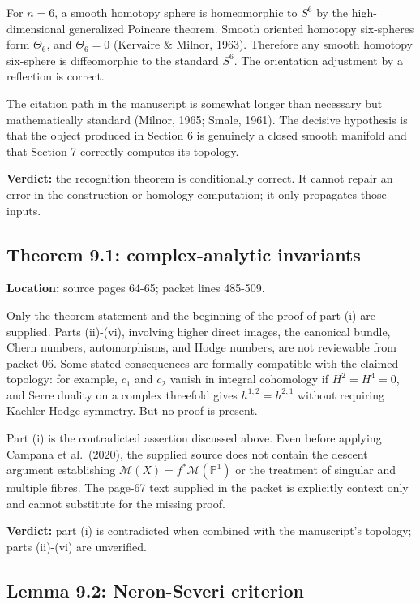 \documentclass[
  10pt,
]{article}
\begin{document}
For \(n=6\), a smooth homotopy sphere is homeomorphic to \(S^6\) by the
high-dimensional generalized Poincare theorem. Smooth oriented homotopy
six-spheres form \(\Theta_6\), and \(\Theta_6=0\) (Kervaire \& Milnor,
1963). Therefore any smooth homotopy six-sphere is diffeomorphic to the
standard \(S^6\). The orientation adjustment by a reflection is correct.

The citation path in the manuscript is somewhat longer than necessary
but mathematically standard (Milnor, 1965; Smale, 1961). The decisive
hypothesis is that the object produced in Section 6 is genuinely a
closed smooth manifold and that Section 7 correctly computes its
topology.

\textbf{Verdict:} the recognition theorem is conditionally correct. It
cannot repair an error in the construction or homology computation; it
only propagates those inputs.

\subsection{Theorem 9.1: complex-analytic
invariants}\label{theorem-9.1-complex-analytic-invariants}

\textbf{Location:} source pages 64-65; packet lines 485-509.

Only the theorem statement and the beginning of the proof of part (i)
are supplied. Parts (ii)-(vi), involving higher direct images, the
canonical bundle, Chern numbers, automorphisms, and Hodge numbers, are
not reviewable from packet 06. Some stated consequences are formally
compatible with the claimed topology: for example, \(c_1\) and \(c_2\)
vanish in integral cohomology if \(H^2=H^4=0\), and Serre duality on a
complex threefold gives \(h^{1,2}=h^{2,1}\) without requiring Kaehler
Hodge symmetry. But no proof is present.

Part (i) is the contradicted assertion discussed above. Even before
applying Campana et al.~(2020), the supplied source does not contain the
descent argument establishing
\(\mathcal M(X)=f^*\mathcal M(\mathbb P^1)\) or the treatment of
singular and multiple fibres. The page-67 text supplied in the packet is
explicitly context only and cannot substitute for the missing proof.

\textbf{Verdict:} part (i) is contradicted when combined with the
manuscript's topology; parts (ii)-(vi) are unverified.

\subsection{Lemma 9.2: Neron-Severi
criterion}\label{lemma-9.2-neron-severi-criterion}
\end{document}
